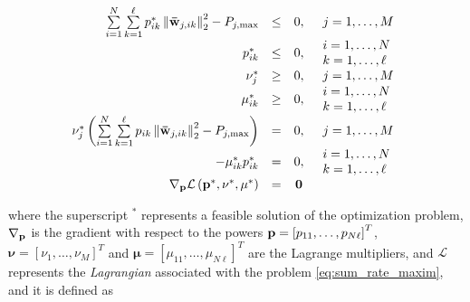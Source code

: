 \begin{equation} \label{eq:kkt_conditions}
\begin{array}{rccl}
	\sum\limits_{i = 1}^N \sum\limits_{k = 1}^\ell p_{ik}^\ast \left\|
    \mathbf{\bar{w}}_{j,ik} \right\|_2^2 - P_{j,\max} & \leq & 0, &
    \begin{array}{l}
        j = 1, \ldots, M
    \end{array}\\

    p_{ik}^\ast &\leq & 0, &
	\begin{array}{l}
	i = 1, \ldots, N\\
	k = 1, \ldots, \ell
	\end{array}\\

    \nu_j^\ast & \geq & 0, &
    \begin{array}{l}
        j = 1, \ldots, M
    \end{array}\\

    \mu_{ik}^\ast & \geq & 0, &
	\begin{array}{l}
	i = 1, \ldots, N\\
	k = 1, \ldots, \ell
	\end{array}\\

    \nu_j^\ast\left(\sum\limits_{i = 1}^N \sum\limits_{k = 1}^\ell p_{ik}
    \left\|\mathbf{\bar{w}}_{j,ik} \right\|_2^2 - P_{j,\max} \right) & = & 0, &
    \begin{array}{l}
        j = 1, \ldots, M
    \end{array}\\

    -\mu_{ik}^\ast p_{ik}^\ast & = & 0, &
	\begin{array}{l}
	i = 1, \ldots, N\\
	k = 1, \ldots, \ell
	\end{array}\\

    \mathbf{\nabla}_{\mathbf{p}} \mathcal{L}\left(\mathbf{p}^\ast, \mathbf{\nu}^\ast,
        \mathbf{\mu}^\ast \right) & = & \mathbf{0}

\end{array}
\end{equation}

\noindent
where the superscript $^\ast$ represents a feasible solution of the optimization
problem, $\mathbf{\nabla}_{\mathbf{p}}$ is the gradient with respect to the powers $\mathbf{p} = 
\left[p_{11}, \ldots, p_{N\ell}\right]^T$, $\mathbf{\nu} = \left[\nu_1, \ldots,
\nu_M\right]^T$ and $\mathbf{\mu} = \left[\mu_{11}, \ldots, \mu_{N\ell}
\right]^T$ are the Lagrange multipliers, and $\mathcal{L}$ represents the
\emph{Lagrangian} associated with the problem \eqref{eq:sum_rate_maxim}, and it
is defined as

